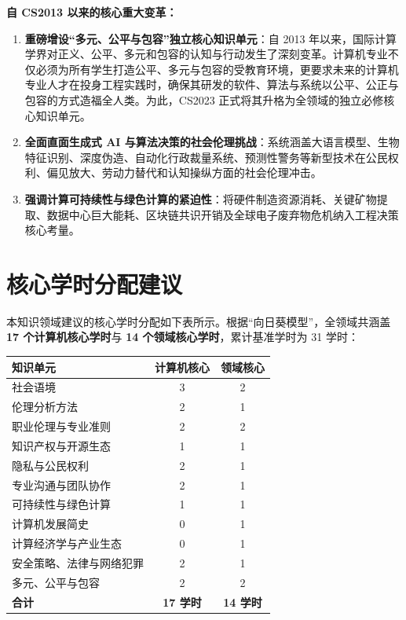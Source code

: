 \begin{preamblebox}[知识领域概述与时代演进]
\textbf{自 CS2013 以来的核心重大变革：}
\begin{enumerate}
    \item \textbf{重磅增设“多元、公平与包容”独立核心知识单元}：自 2013 年以来，国际计算学界对正义、公平、多元和包容的认知与行动发生了深刻变革。计算机专业不仅必须为所有学生打造公平、多元与包容的受教育环境，更要求未来的计算机专业人才在投身工程实践时，确保其研发的软件、算法与系统以公平、公正与包容的方式造福全人类。为此，CS2023 正式将其升格为全领域的独立必修核心知识单元。
    \item \textbf{全面直面生成式 AI 与算法决策的社会伦理挑战}：系统涵盖大语言模型、生物特征识别、深度伪造、自动化行政裁量系统、预测性警务等新型技术在公民权利、偏见放大、劳动力替代和认知操纵方面的社会伦理冲击。
    \item \textbf{强调计算可持续性与绿色计算的紧迫性}：将硬件制造资源消耗、关键矿物提取、数据中心巨大能耗、区块链共识开销及全球电子废弃物危机纳入工程决策核心考量。
\end{enumerate}
\end{preamblebox}

\section{核心学时分配建议}

本知识领域建议的核心学时分配如下表所示。根据“向日葵模型”，全领域共涵盖 \textbf{17 个计算机核心学时}与 \textbf{14 个领域核心学时}，累计基准学时为 31 学时：

\begin{table}[H]
\centering
\setlength{\tabcolsep}{3.5pt}\fontsize{8pt}{9.6pt}\selectfont\begin{tabularx}{\columnwidth}{Y c c}
\toprule
\textbf{知识单元} & \textbf{计算机核心} & \textbf{领域核心} \\
\midrule
社会语境 & 3 & 2 \\
伦理分析方法 & 2 & 1 \\
职业伦理与专业准则 & 2 & 2 \\
知识产权与开源生态 & 1 & 1 \\
隐私与公民权利 & 2 & 1 \\
专业沟通与团队协作 & 2 & 1 \\
可持续性与绿色计算 & 1 & 1 \\
计算机发展简史 & 0 & 1 \\
计算经济学与产业生态 & 0 & 1 \\
安全策略、法律与网络犯罪 & 2 & 1 \\
多元、公平与包容 & 2 & 2 \\
\midrule
\textbf{合计} & \textbf{17 学时} & \textbf{14 学时} \\
\bottomrule
\end{tabularx}
\end{table}

